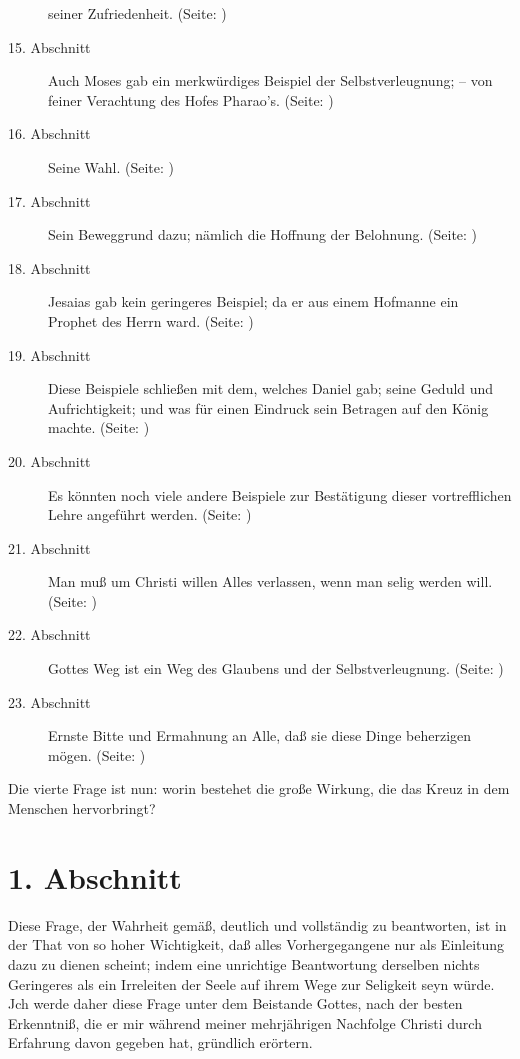 \begin{description}
seiner Zufriedenheit. (Seite: \pageref{kap4_ab14})
\item[15. Abschnitt] Auch Moses gab ein merkwürdiges Beispiel der
Selbstverleugnung; -- von feiner Verachtung des Hofes Pharao's. (Seite: \pageref{kap4_ab15})
\item[16. Abschnitt] Seine Wahl. (Seite: \pageref{kap4_ab16})
\item[17. Abschnitt] Sein Beweggrund dazu; nämlich die Hoffnung der Belohnung. (Seite: \pageref{kap4_ab17})
\item[18. Abschnitt] Jesaias gab kein geringeres Beispiel; da er aus einem
Hofmanne ein Prophet des Herrn ward. (Seite: \pageref{kap4_ab18})
\item[19. Abschnitt] Diese Beispiele schließen mit dem, welches Daniel gab;
seine Geduld und Aufrichtigkeit; und was für einen Eindruck sein Betragen auf
den König machte. (Seite: \pageref{kap4_ab19})
\item[20. Abschnitt] Es könnten noch viele andere Beispiele zur Bestätigung
dieser vortrefflichen Lehre angeführt werden. (Seite: \pageref{kap4_ab20})
\item[21. Abschnitt] Man muß um Christi willen Alles verlassen, wenn man selig
werden will. (Seite: \pageref{kap4_ab21})
\item[22. Abschnitt] Gottes Weg ist ein Weg des Glaubens und der
Selbstverleugnung. (Seite: \pageref{kap4_ab22})
\item[23. Abschnitt] Ernste Bitte und Ermahnung an Alle, daß sie diese Dinge
beherzigen mögen. (Seite: \pageref{kap4_ab23})
\end{description}
\normalsize


Die vierte Frage ist nun: worin bestehet die große Wirkung, die das Kreuz in dem
Menschen hervorbringt?

\section{1. Abschnitt} \label{kap4_ab1}

Diese Frage, der Wahrheit gemäß, deutlich und vollständig zu beantworten, ist in
der That von so hoher Wichtigkeit, daß alles Vorhergegangene nur als Einleitung
dazu zu dienen scheint; indem eine unrichtige Beantwortung derselben nichts
Geringeres als ein Irreleiten der Seele auf ihrem Wege zur Seligkeit seyn würde.
Jch werde daher diese Frage unter dem Beistande Gottes, nach der besten
Erkenntniß, die er mir während meiner mehrjährigen Nachfolge Christi durch
Erfahrung davon gegeben hat, gründlich erörtern.

